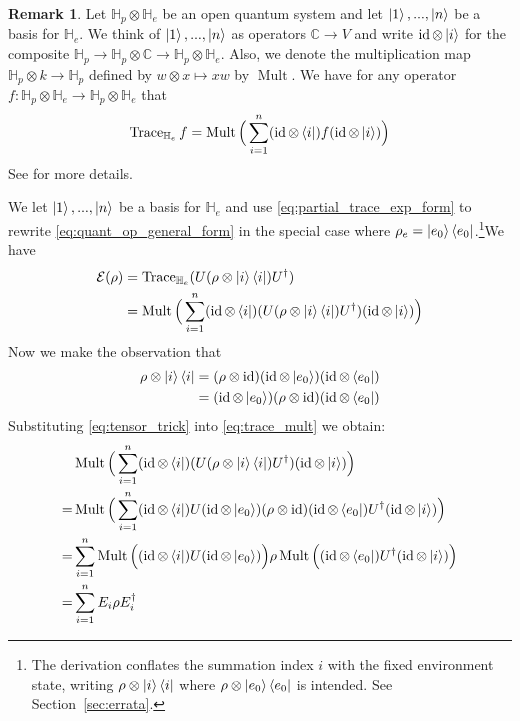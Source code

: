 \documentclass[12pt]{article}
\theoremstyle{plain}
\theoremstyle{definition}
\newtheorem{remark}[thm]{Remark}
\newcommand{\bb}[1]{\mathbb{#1}}
\newcommand{\call}[1]{\mathcal{#1}}
\newcommand{\lto}{\longrightarrow}
\begin{document}
\begin{remark}\label{rmk:operator_sum_derivation}
Let $\bb{H}_p \otimes \bb{H}_e$ be an open quantum system and let $\ket{1},...,\ket{n}$ be a basis for $\bb{H}_e$. We think of $\ket{1},...,\ket{n}$ as operators $\bb{C} \lto V$ and write $\operatorname{id} \otimes \ket{i}$ for the composite $\bb{H}_p \lto \bb{H}_p \otimes \bb{C} \lto \bb{H}_p \otimes \bb{H}_e$. Also, we denote the multiplication map $\bb{H}_p \otimes k \lto \bb{H}_p$ defined by $w \otimes x \longmapsto xw$ by $\operatorname{Mult}$. We have for any operator $f: \bb{H}_p \otimes \bb{H}_e \lto \bb{H}_p \otimes \bb{H}_e$ that
\begin{equation}\label{eq:partial_trace_exp_form}
\operatorname{Trace}_{\bb{H}_e}f = \operatorname{Mult}\Big(\sum_{i = 1}^n (\operatorname{id} \otimes \bra{i})f(\operatorname{id} \otimes \ket{i})\Big)
\end{equation}
See \cite{CommutativeAlgebra} for more details.
\end{remark}
We let $\ket{1},...,\ket{n}$ be a basis for $\bb{H}_e$ and use \eqref{eq:partial_trace_exp_form} to rewrite \eqref{eq:quant_op_general_form} in the special case where $\rho_e = \ket{e_0}\bra{e_0}$.\footnote{The derivation conflates the summation index $i$ with the fixed environment state, writing $\rho\otimes\ket{i}\bra{i}$ where $\rho\otimes\ket{e_0}\bra{e_0}$ is intended. See Section~\ref{sec:errata}.}We have
\begin{align}
\call{E}(\rho) &= \operatorname{Trace}_{\bb{H}_e}(U (\rho \otimes \ket{i}\bra{i})U^\dagger)\\
&= \operatorname{Mult}\Big(\sum_{i = 1}^n (\operatorname{id} \otimes \bra{i}) (U (\rho \otimes \ket{i}\bra{i})U^\dagger)(\operatorname{id} \otimes \ket{i})\Big)\label{eq:trace_mult}
\end{align}
Now we make the observation that
\begin{align}
\rho \otimes \ket{i}\bra{i} &= (\rho \otimes \operatorname{id})(\operatorname{id} \otimes \ket{e_0})(\operatorname{id} \otimes \bra{e_0})\\
&= (\operatorname{id} \otimes \ket{e_0})(\rho \otimes \operatorname{id})(\operatorname{id} \otimes \bra{e_0})\label{eq:tensor_trick}
\end{align}
Substituting \eqref{eq:tensor_trick} into \eqref{eq:trace_mult} we obtain:
\begin{align*}
&\operatorname{Mult}\Big(\sum_{i = 1}^n (\operatorname{id} \otimes \bra{i}) (U (\rho \otimes \ket{i}\bra{i})U^\dagger)(\operatorname{id} \otimes \ket{i})\Big)\\
= &\operatorname{Mult}\Big(\sum_{i = 1}^n (\operatorname{id} \otimes \bra{i}) U (\operatorname{id} \otimes \ket{e_0})(\rho \otimes \operatorname{id})(\operatorname{id} \otimes \bra{e_0})U^\dagger(\operatorname{id} \otimes \ket{i})\Big)\\
= &\sum_{i = 1}^n \operatorname{Mult}\Big((\operatorname{id} \otimes \bra{i}) U (\operatorname{id} \otimes \ket{e_0})\Big)\rho\operatorname{Mult}\Big((\operatorname{id} \otimes \bra{e_0})U^\dagger(\operatorname{id} \otimes \ket{i})\Big)\\
= &\sum_{i = 1}^n E_i \rho E_i^\dagger
\end{align*}
\end{document}
